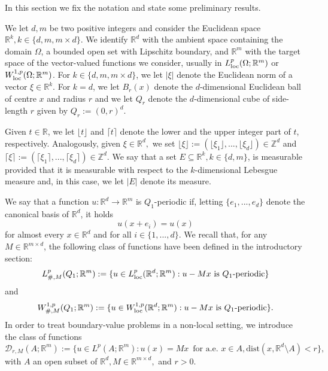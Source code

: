 \documentclass{article}
\theoremstyle{definition}
\newcommand{\R}{\mathbb{R}}
\begin{document}
In this section we fix the notation and state some preliminary results.

We let $d,m$ be two positive integers and consider the Euclidean space $\R^k, k\in\{d,m, m\times d\}$. We identify $\R^d$ with the ambient space containing the domain $\Omega$, a bounded open set with Lipschitz boundary, and $\R^m$ with the target space of the vector-valued functions we consider, usually in $L^p_{\rm loc}(\Omega;\R^m)$ or $W_{\rm loc}^{1,p}(\Omega;\R^m)$. For $k\in\{d,m, m\times d\}$, we let $|\xi|$ denote the Euclidean norm of a vector $\xi\in \R^k$. For $k=d$, we let $B_r(x)$ denote the $d$-dimensional Euclidean ball of centre $x$ and radius $r$ and we let $Q_r$ denote the $d$-dimensional cube of side-length $r$ given by $Q_r:=(0,r)^d$.

Given $t\in \R$, we let $\lfloor t \rfloor$ and $\lceil t \rceil$ denote the lower and the upper integer part of $t$, respectively. Analogously, given $\xi\in \R^d,$ we set $\lfloor \xi \rfloor:=(\lfloor \xi_1 \rfloor,...,\lfloor \xi_d \rfloor)\in \mathbb{Z}^d$ and $\lceil\xi\rceil:=(\lceil \xi_1 \rceil,...,\lceil \xi_d \rceil)\in \mathbb{Z}^d$. We say that a set $E\subseteq \R^k, k\in\{d,m\}$, is measurable provided that it is measurable with respect to the $k$-dimensional Lebesgue measure and, in this case, we let $|E|$ denote its measure.

We say that a function $u: \R^d\to \R^m$ is $Q_1$-periodic if, letting $\{e_1,...,e_d\}$ denote the canonical basis of $\R^d$, it holds
\begin{equation*}
    u(x+e_i)=u(x)
\end{equation*}
for almost every $x\in \R^d$ and for all $i\in\{1,...,d\}$. We recall that, for any $M\in \R^{m\times d}$, the following class of functions have been defined in the introductory section:
\begin{equation*}
    L^p_{\#,M}(Q_1; \R^m):=\{u\in L^{p}_{\rm loc}(\R^d;\R^m) : u-Mx \text{ is } Q_1\text{-periodic}\}
\end{equation*}
and
\begin{equation*}
    W^{1,p}_{\#,M}(Q_1; \R^m):=\{u\in W^{1,p}_{\rm loc}(\R^d;\R^m) : u-Mx \text{ is } Q_1\text{-periodic}\}.
\end{equation*}
In order to treat boundary-value problems in a non-local setting, we introduce the class of functions
\begin{equation*}
    \mathcal{D}_{r,M}(A; \R^m):=\{u\in L^{p}(A;\R^m) : u(x)=Mx \,\text{ for a.e. } x\in A, \text{dist}(x, \R^d\setminus A)<r\},
\end{equation*}
with $A$ an open subset of $\R^d, M\in \R^{m\times d},$ and $r>0$.
\end{document}
